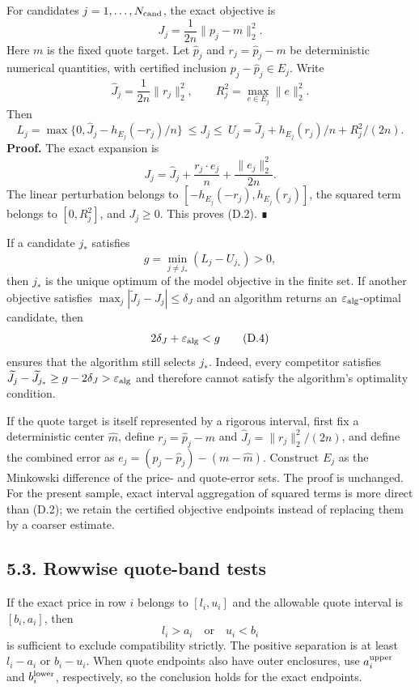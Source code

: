 \documentclass[a4paper,11pt]{article}
\begin{document}
For candidates \(j=1,\ldots,N_{\rm cand}\), the exact objective is
\[
J_j=\frac1{2n}\|p_j-m\|_2^2.
\]
Here \(m\) is the fixed quote target. Let \(\widehat p_j\) and \(r_j=\widehat p_j-m\) be deterministic numerical quantities, with certified inclusion \(p_j-\widehat p_j\in E_j\). Write
\[
\widehat J_j=\frac1{2n}\|r_j\|_2^2,
\qquad R_j^2=\max_{e\in E_j}\|e\|_2^2.
\]
Then
\[
L_j=\max\{0,\widehat J_j-h_{E_j}(-r_j)/n\}
\ \le J_j\le\ 
U_j=\widehat J_j+h_{E_j}(r_j)/n+R_j^2/(2n).
\tag{D.2}
\]
\textbf{Proof.} The exact expansion is
\[
J_j=\widehat J_j+\frac{r_j\cdot e_j}{n}+\frac{\|e_j\|_2^2}{2n}.
\]
The linear perturbation belongs to \([-h_{E_j}(-r_j),h_{E_j}(r_j)]\), the squared term belongs to \([0,R_j^2]\), and \(J_j\ge0\). This proves (D.2). ∎

If a candidate \(j_*\) satisfies
\[
g=\min_{j\ne j_*}(L_j-U_{j_*})>0,
\tag{D.3}
\]
then \(j_*\) is the unique optimum of the model objective in the finite set. If another objective satisfies \(\max_j|\widetilde J_j-J_j|\le\delta_J\) and an algorithm returns an \(\varepsilon_{\rm alg}\)-optimal candidate, then
\[
2\delta_J+\varepsilon_{\rm alg}<g
\tag{D.4}
\]
ensures that the algorithm still selects \(j_*\). Indeed, every competitor satisfies \(\widetilde J_j-\widetilde J_{j_*}\ge g-2\delta_J>\varepsilon_{\rm alg}\) and therefore cannot satisfy the algorithm's optimality condition.

If the quote target is itself represented by a rigorous interval, first fix a deterministic center \(\widehat m\), define \(r_j=\widehat p_j-\widehat m\) and \(\widehat J_j=\|r_j\|_2^2/(2n)\), and define the combined error as \(e_j=(p_j-\widehat p_j)-(m-\widehat m)\). Construct \(E_j\) as the Minkowski difference of the price- and quote-error sets. The proof is unchanged. For the present sample, exact interval aggregation of squared terms is more direct than (D.2); we retain the certified objective endpoints instead of replacing them by a coarser estimate.

\subsection*{5.3. Rowwise quote-band tests}

If the exact price in row \(i\) belongs to \([l_i,u_i]\) and the allowable quote interval is \([b_i,a_i]\), then
\[
l_i>a_i\quad\text{or}\quad u_i<b_i
\tag{D.5}
\]
is sufficient to exclude compatibility strictly. The positive separation is at least \(l_i-a_i\) or \(b_i-u_i\). When quote endpoints also have outer enclosures, use \(a_i^{\rm upper}\) and \(b_i^{\rm lower}\), respectively, so the conclusion holds for the exact endpoints.
\end{document}
